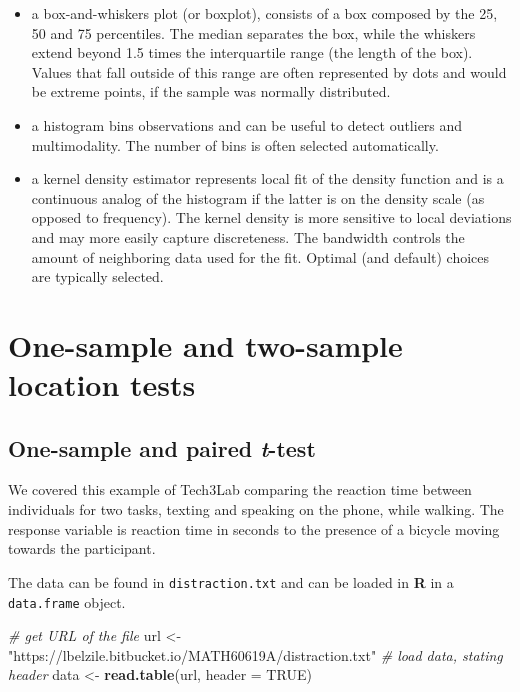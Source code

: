 \documentclass[
]{book}
\newenvironment{Shaded}{\begin{snugshade}}{\end{snugshade}}
\newcommand{\CommentTok}[1]{\textcolor[rgb]{0.56,0.35,0.01}{\textit{#1}}}
\newcommand{\DataTypeTok}[1]{\textcolor[rgb]{0.13,0.29,0.53}{#1}}
\newcommand{\KeywordTok}[1]{\textcolor[rgb]{0.13,0.29,0.53}{\textbf{#1}}}
\newcommand{\NormalTok}[1]{#1}
\newcommand{\OtherTok}[1]{\textcolor[rgb]{0.56,0.35,0.01}{#1}}
\newcommand{\StringTok}[1]{\textcolor[rgb]{0.31,0.60,0.02}{#1}}
\providecommand{\tightlist}{%
  \setlength{\itemsep}{0pt}\setlength{\parskip}{0pt}}
\begin{document}
\begin{itemize}
\tightlist
\item
  a box-and-whiskers plot (or boxplot), consists of a box composed by the 25, 50 and 75 percentiles. The median separates the box, while the whiskers extend beyond 1.5 times the interquartile range (the length of the box). Values that fall outside of this range are often represented by dots and would be extreme points, if the sample was normally distributed.
\item
  a histogram bins observations and can be useful to detect outliers and multimodality. The number of bins is often selected automatically.
\item
  a kernel density estimator represents local fit of the density function and is a continuous analog of the histogram if the latter is on the density scale (as opposed to frequency). The kernel density is more sensitive to local deviations and may more easily capture discreteness. The bandwidth controls the amount of neighboring data used for the fit. Optimal (and default) choices are typically selected.
\end{itemize}

\hypertarget{one-sample-and-two-sample-location-tests}{%
\chapter{One-sample and two-sample location tests}\label{one-sample-and-two-sample-location-tests}}

\hypertarget{one-sample-and-paired-t-test}{%
\section{\texorpdfstring{One-sample and paired \emph{t}-test}{One-sample and paired t-test}}\label{one-sample-and-paired-t-test}}

We covered this example of Tech3Lab comparing the reaction time between individuals for two tasks, texting and speaking on the phone, while walking. The response variable is reaction time in seconds to the presence of a bicycle moving towards the participant.

The data can be found in \texttt{distraction.txt} and can be loaded in \textbf{R} in a \texttt{data.frame} object.

\begin{Shaded}
\begin{Highlighting}[]
\CommentTok{# get URL of the file}
\NormalTok{url <-}\StringTok{ "https://lbelzile.bitbucket.io/MATH60619A/distraction.txt"}
\CommentTok{# load data, stating header}
\NormalTok{data <-}\StringTok{ }\KeywordTok{read.table}\NormalTok{(url, }\DataTypeTok{header =} \OtherTok{TRUE}\NormalTok{)}
\end{Highlighting}
\end{Shaded}
\end{document}
